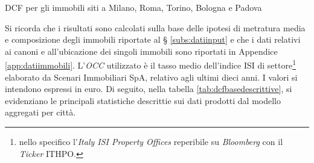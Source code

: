\begin{table}[htbp]
\begin{center} 

\hspace{5mm}

\hspace{5mm}
\vspace{1cm}

\hspace{5mm}

\hspace{5mm}

\caption[DCF per gli immobili scelti]{DCF per gli immobili siti a Milano, Roma, Torino, Bologna e Padova}
\label{tab:dcfmirotobopd}
\end{center}
\end{table}

Si ricorda che i risultati sono calcolati sulla base delle ipotesi di metratura media e composizione degli immobili riportate al § \ref{subs:datiinput} e che i dati relativi ai canoni e all'ubicazione dei singoli immobili sono riportati in Appendice \ref{app:datiimmobili}.
L'\textit{OCC} utilizzato è il tasso medio dell'indice ISI di settore\footnote{nello specifico l'{\itshape Italy ISI Property Offices} reperibile su \textit{Bloomberg} con il \textit{Ticker} ITHPO.} elaborato da Scenari Immobiliari SpA, relativo agli ultimi dieci anni. I valori si intendono espressi in euro.
Di seguito, nella tabella \ref{tab:dcfbasedescrittive}, si evidenziano le principali statistiche descrittie sui dati prodotti dal modello aggregati per città.


